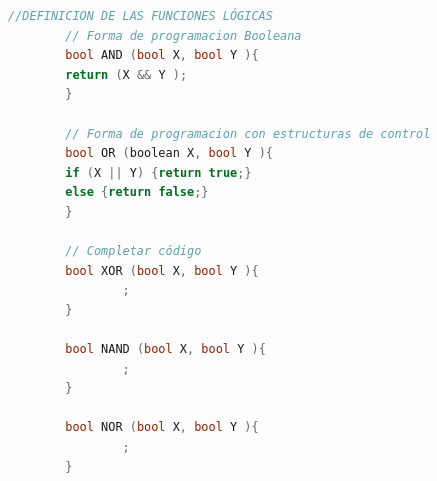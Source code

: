 {\begin{lstlisting}[language=C++]
		//DEFINICION DE LAS FUNCIONES LÓGICAS
		// Forma de programacion Booleana
		bool AND (bool X, bool Y ){
		return (X && Y ); 
		}
		
		// Forma de programacion con estructuras de control
		bool OR (boolean X, bool Y ){
		if (X || Y) {return true;} 
		else {return false;}
		}
		
		// Completar código
		bool XOR (bool X, bool Y ){
				; 
		}
		
		bool NAND (bool X, bool Y ){
				; 
		}		
		
		bool NOR (bool X, bool Y ){
				; 
		}
		\end{lstlisting}
}

